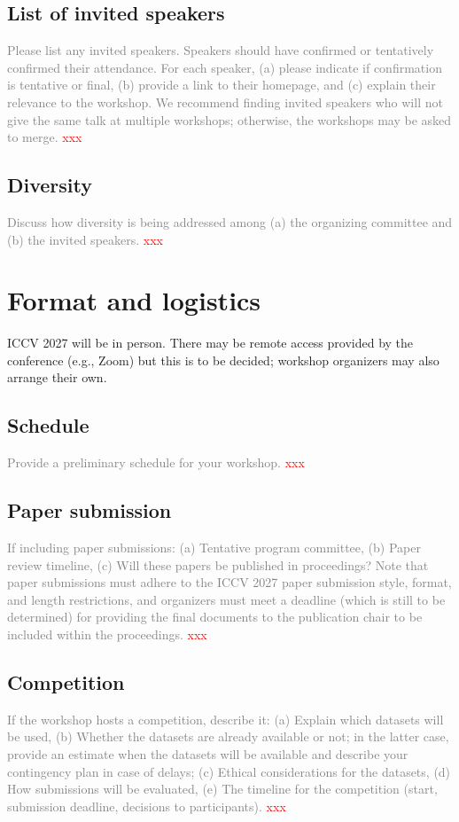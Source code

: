 \documentclass{article}
\newcommand\conf{ICCV 2027\xspace}
\def\c#1{\textcolor{gray}{#1}}
\def\x{\textcolor{red}{xxx}}
\begin{document}
\subsection{List of invited speakers}
\c{Please list any invited speakers. Speakers should have confirmed or tentatively confirmed their attendance. For each speaker, (a) please indicate if confirmation is tentative or final, (b) provide a link to their homepage, and (c) explain their relevance to the workshop. We recommend finding invited speakers who will not give the same talk at multiple workshops; otherwise, the workshops may be asked to merge.}
\x
\subsection{Diversity}
\c{Discuss how diversity is being addressed among (a) the organizing committee and (b) the invited speakers.}
\x


\section{Format and logistics}
\conf will be in person. There may be remote access provided by the conference (e.g., Zoom) but this is to be decided; workshop organizers may also arrange their own.
\subsection{Schedule}
\c{Provide a preliminary schedule for your workshop.}
\x
\subsection{Paper submission}
\c{If including paper submissions: (a) Tentative program committee, (b) Paper review timeline, (c) Will these papers be published in proceedings? Note that paper submissions must adhere to the \conf paper submission style, format, and length restrictions, and organizers must meet a deadline (which is still to be determined) for providing the final documents to the publication chair to be included within the proceedings.}
\x
\subsection{Competition}
\c{If the workshop hosts a competition, describe it: (a) Explain which datasets will be used, (b) Whether the datasets are already available or not; in the latter case, provide an estimate when the datasets will be available and describe your contingency plan in case of delays; (c) Ethical considerations for the datasets, (d) How submissions will be evaluated, (e) The timeline for the competition (start, submission deadline, decisions to participants).}
\x
\end{document}
